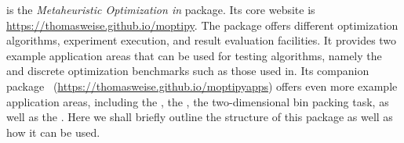 %
%
\moptipy{} is the \emph{Metaheuristic Optimization in \python} package.
Its core website is \url{https://thomasweise.github.io/moptipy}.
The package offers different optimization algorithms, experiment execution, and result evaluation facilities.
It provides two example application areas that can be used for testing algorithms, namely the  and discrete optimization benchmarks such as those used in.
Its companion package ~(\url{https://thomasweise.github.io/moptipyapps}) offers even more example application areas, including the , the , the two-dimensional bin packing task, as well as the .
Here we shall briefly outline the structure of this package as well as how it can be used.%
%
\endhsection%
